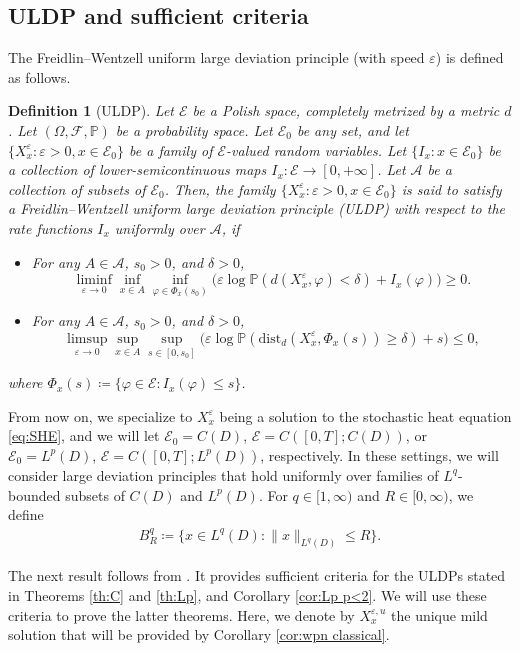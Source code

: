 \documentclass[10pt,a4paper]{amsart}
\newtheorem{definition}[theorem]{Definition}
\numberwithin{equation}{section}
\newcommand{\ceqq}{\coloneqq}
\newcommand{\eps}{\varepsilon}
\begin{document}
\subsection{ULDP and sufficient criteria}
 
The Freidlin--Wentzell uniform large deviation principle (with speed $\eps$) is defined as follows. 
\begin{definition}[ULDP]\label{def:uldp}
Let $\mathcal{E}$ be a Polish space, completely metrized by a metric $d$. 
Let $(\Omega, \mathcal{F}, \mathbb{P})$ be a probability space.  Let $ \mathcal{E}_0$ be any set, and let $\{X^\eps_x: \eps>0,x\in \mathcal{E}_0\}$ be a family of $\mathcal{E}$-valued random variables. Let $\{I_x : x \in \mathcal{E}_0\}$ be a collection of lower-semicontinuous maps $I_x : \mathcal{E} \to [0,+\infty]$. 
Let $\mathscr{A}$ be a collection of subsets of $\mathcal{E}_0$.  
Then, the family $\{X^\eps_x: \eps>0,x\in \mathcal{E}_0\}$ is said to satisfy a \emph{Freidlin--Wentzell uniform large deviation principle (ULDP) with respect to the rate functions $I_x$ uniformly over $\mathscr{A}$}, if
\begin{itemize}
\item For any $A \in \mathscr{A}$, $s_0 > 0$, and $\delta > 0$,
\[
\liminf_{\eps \to 0} \inf_{x \in A} \inf_{\varphi \in \Phi_x(s_0)} \big(\eps\log \mathbb{P}(d(X^\eps_x, \varphi) < \delta) + I_x(\varphi)\big) \geq 0.
\]
\item For any $A \in \mathscr{A}$, $s_0 > 0$, and $\delta > 0$,
\[
\limsup_{\eps \to 0} \sup_{x \in A} \sup_{s \in [0,s_0]} \big(\eps \log \mathbb{P}(\mathrm{dist}_d(X^\eps_x, \Phi_x(s)) \geq \delta) + s\big) \leq 0,
\]
\end{itemize}
where $\Phi_x(s) \ceqq \{\varphi \in \mathcal{E} : I_x(\varphi) \leq s\}$. 
\end{definition}

From now on, we specialize to $X^\eps_x$ being a solution to the stochastic heat equation \eqref{eq:SHE}, and we will let $\mathcal{E}_0= C(D)$, $\mathcal{E}=C([0,T];C(D))$, or $\mathcal{E}_0= L^p(D)$, $\mathcal{E}=C([0,T];L^p(D))$, respectively. 
In these settings, we will consider large deviation principles that hold uniformly over  families of $L^q$-bounded subsets of $C(D)$ and $L^p(D)$. For  $q\in[1,\infty)$ and $R\in[0,\infty)$, we define 
\begin{align}\label{eq:BqR}
 B_{R}^{q}\ceqq \{x\in L^q(D) :\|x\|_{L^q(D)}\leq R\}. 
\end{align} 
 
The next result follows from \cite[Th.\ 2.13]{Salins19equivalences}. It provides sufficient criteria for the ULDPs stated in Theorems \ref{th:C} and  \ref{th:Lp}, and Corollary \ref{cor:Lp p<2}. We will use these criteria to prove the latter theorems. Here, we denote by $X_x^{\eps,u}$  the unique mild solution that will be provided by Corollary  \ref{cor:wpn classical}.  
\end{document}
